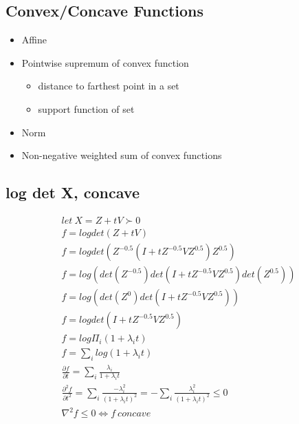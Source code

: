 \documentclass[8pt]{report}
\begin{document}
\begin{multicols*}{2}
  \section{Convex/Concave Functions}

  \begin{itemize}
  \item Affine
  \item Pointwise supremum of convex function
    \begin{itemize}
    \item distance to farthest point in a set
    \item support function of set
    \end{itemize}
  \item Norm
  \item Non-negative weighted sum of convex functions
  \end{itemize}
  
  \subsection{log det X, concave}
  \begin{align*}
    let\ X=Z+tV \succ 0\\
    f=log det(Z+tV)\\
    f=log det(Z^{-0.5}(I+tZ^{-0.5}VZ^{0.5})Z^{0.5})\\
    f=log (det(Z^{-0.5})det(I+tZ^{-0.5}VZ^{0.5})det(Z^{0.5}))\\
    f=log (det(Z^{0})det(I+tZ^{-0.5}VZ^{0.5}))\\
    f=log det(I+tZ^{-0.5}VZ^{0.5})\\
    f=log \Pi_i (1+\lambda_i t)\\
    f=\sum_i log(1+\lambda_i t)\\
    \frac{\partial f}{\partial t} = \sum_i \frac{\lambda_i}{1+\lambda_i t}\\
    \frac{\partial^2 f}{\partial t^2} = \sum_i \frac{-\lambda_i^2}{(1+\lambda_i t)^2} = -\sum_i \frac{\lambda_i^2}{(1+\lambda_i t)^2} \leq 0\\
    \nabla^2 f \leq 0 \iff f\ concave\\
  \end{align*}

  \vfill\null
  \columnbreak
    

\end{multicols*}
\end{document}
